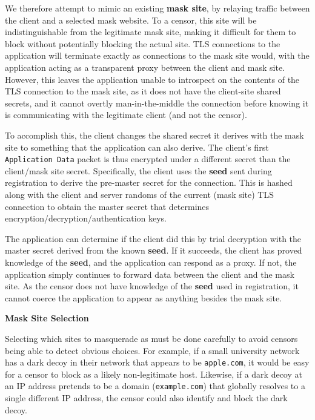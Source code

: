 \documentclass[letterpaper,twocolumn,10pt]{article}
\renewcommand{\paragraph}[1]{\smallskip\noindent\textbf{#1\quad}}
\begin{document}
We therefore attempt to mimic an existing \textbf{mask site}, by relaying
traffic between the client and a selected mask website. To a censor, this site
will be indistinguishable from the legitimate mask site, making it difficult for
them to block without potentially blocking the actual site. TLS connections to the
application will terminate exactly as connections to the mask site would, with the
application acting as a transparent proxy between the client and mask site.
However, this leaves the application unable to introspect on the contents of the
TLS connection to the mask site, as it does not have the client-site shared
secrets, and it cannot overtly man-in-the-middle the connection before knowing
it is communicating with the legitimate client (and not the censor).


To accomplish this, the client changes the shared secret it derives with the
mask site to something that the application can also derive. The client's first
\texttt{Application Data} packet is thus encrypted under a different secret than
the client/mask site secret. Specifically, the client uses the \textbf{seed}
sent during registration to derive the pre-master secret for the connection.
This is hashed along with the client and server randoms of the current (mask
site) TLS connection to obtain the master secret that determines
encryption/decryption/authentication keys.

The application can determine if the client did this by trial decryption with
the master secret derived from the known \textbf{seed}. If it succeeds, the
client has proved knowledge of the \textbf{seed}, and the application can
respond as a proxy. If not, the application simply continues to forward data
between the client and the mask site. As the censor does not have knowledge of
the \textbf{seed} used in registration, it cannot coerce the application to
appear as anything besides the mask site.


\paragraph{Mask Site Selection}

Selecting which sites to masquerade as must be done carefully to avoid censors
being able to detect obvious choices. For example, if a small university network
has a dark decoy in their network that appears to be \texttt{apple.com}, it
would be easy for a censor to block as a likely non-legitimate host. Likewise,
if a dark decoy at an IP address pretends to be a domain (\texttt{example.com}) that
globally resolves to a single different IP address, the censor could also
identify and block the dark decoy.
\end{document}

